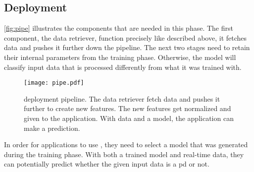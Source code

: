 \subsection{Deployment}
\autoref{fig:pipe} illustrates the components that are needed in this phase. The first component, the data retriever, function precisely like described above, it fetches data and pushes it further down the pipeline. The next two stages need to retain their internal parameters from the training phase. Otherwise, the model will classify input data that is processed differently from what it was trained with. 

\begin{figure}[ht]
    \centering
    \texttt{[image: pipe.pdf]}
    \caption[\project's deployment pipeline]{deployment pipeline. The data retriever fetch data and pushes it further to create new features. The new features get normalized and given to the application. With data and a model, the application can make a prediction.}
    \label{fig:pipe}
\end{figure}

In order for applications to use \project, they need to select a model that was generated during the training phase. With both a trained model and real-time data, they can potentially predict whether the given input data is a \ac{pd} or not.